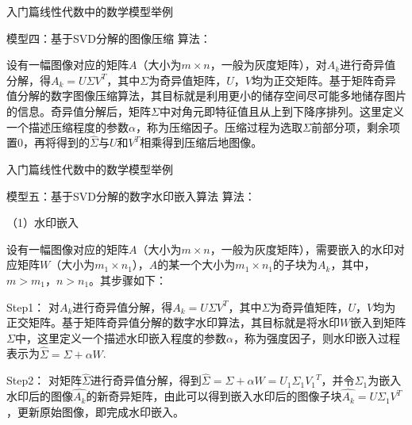 \documentclass{beamer}
\begin{document}
\begin{frame}{入门篇}{线性代数中的数学模型举例}
\begin{block}{模型四：基于SVD分解的图像压缩}
算法：

设有一幅图像对应的矩阵$A$（大小为$m\times n$，一般为灰度矩阵），对$A_k$进行奇异值分解，得$A_k=U{\Sigma}V^T$，其中$\Sigma$为奇异值矩阵，$U$，$V$均为正交矩阵。基于矩阵奇异值分解的数字图像压缩算法，其目标就是利用更小的储存空间尽可能多地储存图片的信息。奇异值分解后，矩阵$\Sigma$中对角元即特征值且从上到下降序排列。这里定义一个描述压缩程度的参数$\alpha$，称为压缩因子。压缩过程为选取$\Sigma$前部分项，剩余项置0，再将得到的$\hat{\Sigma}$与$U$和$V^T$相乘得到压缩后地图像。
\end{block}
\end{frame}

\begin{frame}{入门篇}{线性代数中的数学模型举例}
\begin{block}{模型五：基于SVD分解的数字水印嵌入算法}
算法：

{\color{blue} （1）水印嵌入}

设有一幅图像对应的矩阵$A$（大小为$m\times n$，一般为灰度矩阵），需要嵌入的水印对应矩阵$W$（大小为$m_1 \times n_1$），$A$的某一个大小为$m_1 \times n_1$的子块为$A_k$，其中，$m>m_1$，$n>n_1$。其步骤如下：

{\color{blue} Step1：}
对$A_k$进行奇异值分解，得$A_k=U{\Sigma}V^T$，其中$\Sigma$为奇异值矩阵，$U$，$V$均为正交矩阵。基于矩阵奇异值分解的数字水印算法，其目标就是将水印$W$嵌入到矩阵$\Sigma$中，这里定义一个描述水印嵌入程度的参数$\alpha$，称为强度因子，则水印嵌入过程表示为$\hat{\Sigma}=\Sigma+\alpha W$.

{\color{blue} Step2：}
对矩阵$\hat{\Sigma}$进行奇异值分解，得到$\hat{\Sigma}=\Sigma+\alpha W=U_1 {\Sigma}_1 {V_1}^T$，并令${\Sigma}_1$为嵌入水印后的图像$\hat{A_k}$的新奇异矩阵，由此可以得到嵌入水印后的图像子块$\hat{A_k}=U \Sigma_1 V^T$，更新原始图像，即完成水印嵌入。
\end{block}
\end{frame}
\end{document}
